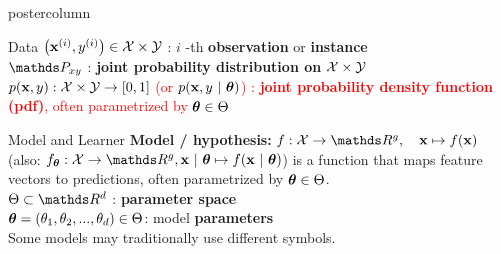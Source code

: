 \documentclass{beamer}
\begin{document}
\begin{frame}[fragile]{}
\begin{columns}
\begin{column}{.31\textwidth}
\begin{beamercolorbox}[center]{postercolumn}
\begin{minipage}{.98\textwidth}
{\begin{myblock}{Data}
            $\left(\mathbf{x}^{(i)}, y^{(i)}\right) \in \mathcal{X}\times \mathcal{Y}$ : $i$ -th \textbf{observation} or \textbf{instance} \\
             
            $\P_{xy}$ : \textbf{joint probability distribution on} $\mathcal{X} \times \mathcal{Y}$ \\
              
            \textcolor{red}{$p(\mathbf{x},y): \mathcal{X} \times \mathcal{Y} \rightarrow [0, 1]$ (or $p(\mathbf{x}, y ~|~ \bm{\theta})$) : \textbf{joint probability density function (pdf)}, often parametrized by $\bm{\theta} \in \Theta$} \\
					\end{myblock}
					\begin{myblock}{Model and Learner}
            \textbf{Model / \textbf{hypothesis}: }$f : \Xspace \rightarrow \R^g, \quad \xv \mapsto \fx$ (also: $f_{\thetab} : \Xspace \rightarrow \R^g, \xv ~|~ \thetab \mapsto \fxt$) is a function that maps feature vectors to predictions, often parametrized by $\bm{\theta} \in \Theta$. \\
            
            
            
            $\Theta \subset \R^d$ : \textbf{parameter space} \\
              
            $\bm{\theta} = (\theta_1, \theta_2, ..., \theta_d) \in \Theta$: model \textbf{parameters}\\
              \hspace*{1ex}Some models may traditionally use different symbols. \\
      

\end{myblock}}
\end{minipage}
\end{beamercolorbox}
\end{column}
\end{columns}
\end{frame}
\end{document}
